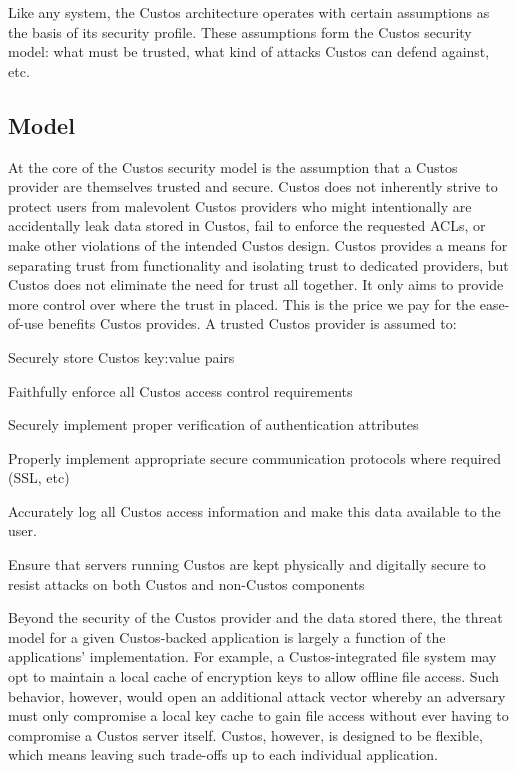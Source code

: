 Like any system, the Custos architecture operates with certain
assumptions as the basis of its security profile. These assumptions
form the Custos security model: what must be trusted, what kind of
attacks Custos can defend against, etc.

\subsection{Model}

At the core of the Custos security model is the assumption that a
Custos provider are themselves trusted and secure. Custos does not
inherently strive to protect users from malevolent Custos providers
who might intentionally are accidentally leak data stored in Custos, fail
to enforce the requested ACLs, or make other violations of the intended
Custos design. Custos provides a means for separating trust from
functionality and isolating trust to dedicated providers, but Custos
does not eliminate the need for trust all together. It only aims to
provide more control over where the trust in placed. This is the price
we pay for the ease-of-use benefits Custos provides. A trusted Custos
provider is assumed to:

\begin{packed_item}
\item Securely store Custos key:value pairs
\item Faithfully enforce all Custos access control requirements
\item Securely implement proper verification of authentication attributes
\item Properly implement appropriate secure communication protocols where
  required (SSL, etc)
\item Accurately log all Custos access information and make this data
  available to the user.
\item Ensure that servers running Custos are kept physically and
  digitally secure to resist attacks on both Custos and non-Custos
  components
\end{packed_item}

Beyond the security of the Custos provider and the data stored there,
the threat model for a given Custos-backed application is largely a
function of the applications' implementation. For example, a
Custos-integrated file system may opt to maintain a local cache of
encryption keys to allow offline file access. Such behavior, however,
would open an additional attack vector whereby an adversary must only
compromise a local key cache to gain file access without ever having
to compromise a Custos server itself. Custos, however, is designed to
be flexible, which means leaving such trade-offs up to each individual
application.

